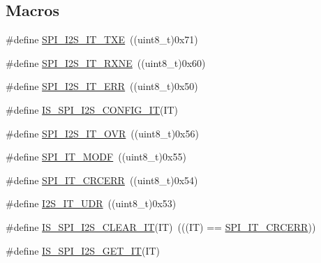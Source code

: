 \subsection*{Macros}
\begin{DoxyCompactItemize}
\item 
\#define \hyperlink{group___s_p_i___i2_s__interrupts__definition_ga0f192977fdb12c40d35672b8ae074724}{S\+P\+I\+\_\+\+I2\+S\+\_\+\+I\+T\+\_\+\+T\+XE}~((uint8\+\_\+t)0x71)
\item 
\#define \hyperlink{group___s_p_i___i2_s__interrupts__definition_gae46dd53cd2e4ad8b8a7836d3dcec57ea}{S\+P\+I\+\_\+\+I2\+S\+\_\+\+I\+T\+\_\+\+R\+X\+NE}~((uint8\+\_\+t)0x60)
\item 
\#define \hyperlink{group___s_p_i___i2_s__interrupts__definition_ga1d9d4916bf7ae315f23a54ecfbcd9157}{S\+P\+I\+\_\+\+I2\+S\+\_\+\+I\+T\+\_\+\+E\+RR}~((uint8\+\_\+t)0x50)
\item 
\#define \hyperlink{group___s_p_i___i2_s__interrupts__definition_ga3ec2f6950d7ff801f992e65593c3365e}{I\+S\+\_\+\+S\+P\+I\+\_\+\+I2\+S\+\_\+\+C\+O\+N\+F\+I\+G\+\_\+\+IT}(IT)
\item 
\#define \hyperlink{group___s_p_i___i2_s__interrupts__definition_ga279c30176e8ff7e2ec299774a2e88f45}{S\+P\+I\+\_\+\+I2\+S\+\_\+\+I\+T\+\_\+\+O\+VR}~((uint8\+\_\+t)0x56)
\item 
\#define \hyperlink{group___s_p_i___i2_s__interrupts__definition_ga0b9780d5f31fd80f4d0fa7d6860041e9}{S\+P\+I\+\_\+\+I\+T\+\_\+\+M\+O\+DF}~((uint8\+\_\+t)0x55)
\item 
\#define \hyperlink{group___s_p_i___i2_s__interrupts__definition_ga9aa97a5ce8d3500dc14ca4e30eada199}{S\+P\+I\+\_\+\+I\+T\+\_\+\+C\+R\+C\+E\+RR}~((uint8\+\_\+t)0x54)
\item 
\#define \hyperlink{group___s_p_i___i2_s__interrupts__definition_ga54aba7dc06f97fb4839de5f42bd5a47d}{I2\+S\+\_\+\+I\+T\+\_\+\+U\+DR}~((uint8\+\_\+t)0x53)
\item 
\#define \hyperlink{group___s_p_i___i2_s__interrupts__definition_gabeb917a0a708af0439f753a5f4af4c5e}{I\+S\+\_\+\+S\+P\+I\+\_\+\+I2\+S\+\_\+\+C\+L\+E\+A\+R\+\_\+\+IT}(IT)~(((IT) == \hyperlink{group___s_p_i___i2_s__interrupts__definition_ga9aa97a5ce8d3500dc14ca4e30eada199}{S\+P\+I\+\_\+\+I\+T\+\_\+\+C\+R\+C\+E\+RR}))
\item 
\#define \hyperlink{group___s_p_i___i2_s__interrupts__definition_gacb2949c066a74f1c4ef8c6a0d4e14a0c}{I\+S\+\_\+\+S\+P\+I\+\_\+\+I2\+S\+\_\+\+G\+E\+T\+\_\+\+IT}(IT)
\end{DoxyCompactItemize}


